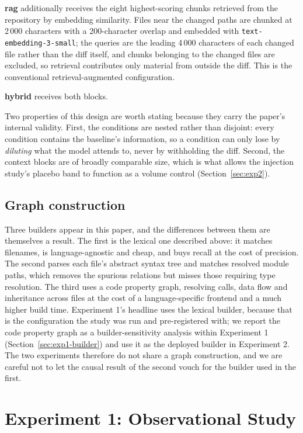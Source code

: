 \documentclass[conference]{IEEEtran}
\begin{document}
\textbf{rag} additionally receives the eight highest-scoring chunks retrieved
from the repository by embedding similarity. Files near the changed paths are
chunked at 2\,000 characters with a 200-character overlap and embedded with
\texttt{text-embedding-3-small}; the queries are the leading 4\,000 characters
of each changed file rather than the diff itself, and chunks belonging to the
changed files are excluded, so retrieval contributes only material from outside
the diff. This is the conventional retrieval-augmented configuration.

\textbf{hybrid} receives both blocks.

Two properties of this design are worth stating because they carry the
paper's internal validity. First, the conditions are nested rather than
disjoint: every condition contains the baseline's information, so a
condition can only lose by \emph{diluting} what the model attends to, never
by withholding the diff. Second, the context blocks are of broadly
comparable size, which is what allows the injection study's placebo band to
function as a volume control (Section~\ref{sec:exp2}).

\subsection{Graph construction}
Three builders appear in this paper, and the differences between them are
themselves a result. The first is the lexical one described above: it matches
filenames, is language-agnostic and cheap, and buys recall at the cost of
precision. The second parses each file's abstract syntax tree and matches
resolved module paths, which removes the spurious relations but misses those
requiring type resolution. The third uses a code property graph, resolving
calls, data flow and inheritance across files at the cost of a
language-specific frontend and a much higher build time. Experiment 1's
headline uses the lexical builder, because that is the configuration the study
was run and pre-registered with; we report the code property graph as a
builder-sensitivity analysis within Experiment 1
(Section~\ref{sec:exp1-builder}) and use it as the deployed builder in
Experiment 2. The two experiments therefore do not share a graph
construction, and we are careful not to let the causal result of the second
vouch for the builder used in the first.

\section{Experiment 1: Observational Study}
\label{sec:exp1}
\end{document}
